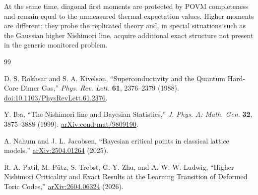 \documentclass[11pt]{article}
\begin{document}
At the same time, diagonal first moments are protected by POVM completeness and remain equal to the unmeasured thermal expectation values. Higher moments are different: they probe the replicated theory and, in special situations such as the Gaussian higher Nishimori line, acquire additional exact structure not present in the generic monitored problem.

\begin{thebibliography}{99}

D. S. Rokhsar and S. A. Kivelson,
``Superconductivity and the Quantum Hard-Core Dimer Gas,''
\emph{Phys. Rev. Lett.} \textbf{61}, 2376--2379 (1988).
\href{https://journals.aps.org/prl/abstract/10.1103/PhysRevLett.61.2376}{doi:10.1103/PhysRevLett.61.2376}.

Y. Iba,
``The Nishimori line and Bayesian Statistics,''
\emph{J. Phys. A: Math. Gen.} \textbf{32}, 3875--3888 (1999).
\href{https://arxiv.org/abs/cond-mat/9809190}{arXiv:cond-mat/9809190}.

A. Nahum and J. L. Jacobsen,
``Bayesian critical points in classical lattice models,''
\href{https://arxiv.org/abs/2504.01264}{arXiv:2504.01264} (2025).

R. A. Patil, M. P\"utz, S. Trebst, G.-Y. Zhu, and A. W. W. Ludwig,
``Higher Nishimori Criticality and Exact Results at the Learning Transition of Deformed Toric Codes,''
\href{https://arxiv.org/abs/2604.06324}{arXiv:2604.06324} (2026).

\end{thebibliography}
\end{document}
